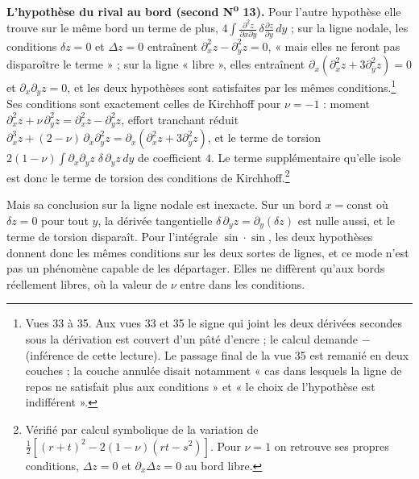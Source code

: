 \documentclass[11pt,a4paper]{article}
\begin{document}
\textbf{L'hypothèse du rival au bord (second N\textsuperscript{o} 13).} Pour
l'autre hypothèse elle trouve sur le même bord un terme de plus,
$4\int \frac{\partial^2 z}{\partial x\partial y}\,\delta\frac{\partial
z}{\partial y}\,dy$ ; sur la ligne nodale, les conditions $\delta z = 0$ et
$\Delta z = 0$ entraînent $\partial_x^2 z - \partial_y^2 z = 0$, « mais elles ne
feront pas disparoître le terme » ; sur la ligne « libre », elles entraînent
$\partial_x(\partial_x^2 z + 3\partial_y^2 z) = 0$ et $\partial_x\partial_y z =
0$, et les deux hypothèses sont satisfaites par les mêmes
conditions.\footnote{Vues 33 à 35. Aux vues 33 et 35 le signe qui joint les deux
dérivées secondes sous la dérivation est couvert d'un pâté d'encre ; le calcul
demande $-$ (inférence de cette lecture). Le passage final de la vue 35 est
remanié en deux couches ; la couche annulée disait notamment « cas dans lesquels
la ligne de repos ne satisfait plus aux conditions » et « le choix de
l'hypothèse est indifférent ».} Ses conditions sont exactement celles de
Kirchhoff pour $\nu = -1$ : moment $\partial_x^2 z + \nu\,\partial_y^2 z =
\partial_x^2 z - \partial_y^2 z$, effort tranchant réduit $\partial_x^3 z +
(2-\nu)\,\partial_x\partial_y^2 z = \partial_x(\partial_x^2 z + 3\partial_y^2
z)$, et le terme de torsion $2(1-\nu)\int \partial_x\partial_y z\;\delta\,
\partial_y z\,dy$ de coefficient $4$. Le terme supplémentaire qu'elle isole est
donc le terme de torsion des conditions de Kirchhoff.\footnote{Vérifié par
calcul symbolique de la variation de $\frac12[(r+t)^2 - 2(1-\nu)(rt-s^2)]$. Pour
$\nu = 1$ on retrouve ses propres conditions, $\Delta z = 0$ et
$\partial_x\Delta z = 0$ au bord libre.}

Mais sa conclusion sur la ligne nodale est inexacte. Sur un bord $x =
\mathrm{const}$ où $\delta z = 0$ pour tout $y$, la dérivée tangentielle
$\delta\,\partial_y z = \partial_y(\delta z)$ est nulle aussi, et le terme de
torsion disparaît. Pour l'intégrale $\sin\cdot\sin$, les deux hypothèses
donnent donc les mêmes conditions sur les deux sortes de lignes, et ce mode
n'est pas un phénomène capable de les départager. Elles ne diffèrent qu'aux
bords réellement libres, où la valeur de $\nu$ entre dans les conditions.
\end{document}
